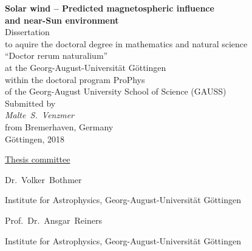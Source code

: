 
\begin{titlepage}
	\begin{center}
		\vspace*{\fill}
		\renewcommand{\baselinestretch}{1.5}
		{\LARGE\sffamily
			\textbf{Solar wind -- Predicted magnetospheric influence\\and near-Sun environment}\\
		}
		\Large\rmfamily
		\vspace{3\baselineskip}
		Dissertation\\
		to aquire the doctoral degree in mathematics and natural science\\	%
		``Doctor rerum naturalium''\\
		at the Georg-August-Universität Göttingen\\
		\vspace{\baselineskip}
		within the doctoral program ProPhys\\
		of the Georg-August University School of Science (GAUSS)\\
		\vspace{4\baselineskip}
		Submitted by\\
		\textit{%
			Malte~S.~Venzmer\\
		}
		from Bremerhaven, Germany\\
		\vspace{4\baselineskip}
		Göttingen, 2018
		\vspace{\baselineskip}
		\vspace{\fill}
	\end{center}
\end{titlepage}

\newpage


\vspace*{\fill}

\noindent \underline{Thesis committee}
\vspace{\baselineskip}

Dr.~Volker~Bothmer

Institute for Astrophysics, Georg-August-Universität Göttingen
\vspace{\baselineskip}

Prof.~Dr.~Ansgar~Reiners

Institute for Astrophysics, Georg-August-Universität Göttingen
% 
\vspace{3\baselineskip}

